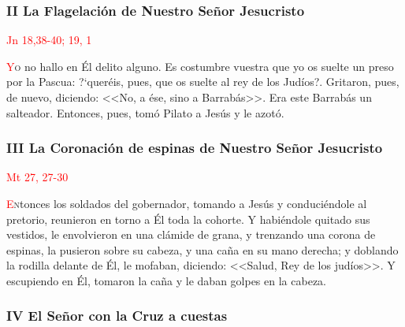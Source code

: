 \documentclass[10pt,twoside]{book}
\begin{document}
\noindent\subsubsection*{II La Flagelación de Nuestro Señor Jesucristo}

\vspace{-0.5em}

\hfill\textcolor{red}{Jn 18,38-40; 19, 1}

\lettrine[lines=2, ante=\guillemotleft]{\textcolor{red}{Y}}o no hallo en Él delito alguno. Es costumbre vuestra que yo os suelte un preso por la Pascua: {?`}queréis, 
pues, que os suelte al rey de los Judíos?\guillemotright. Gritaron, pues, de nuevo, diciendo: <<No, a ése, sino a Barrabás>>. 
Era este Barrabás un salteador. Entonces, pues, tomó Pilato a Jesús y le azotó.

\vspace{0.5em}



\vspace{1.5em}

\noindent\subsubsection*{III La Coronación de espinas de Nuestro Señor Jesucristo}

\vspace{-0.5em}

\hfill\textcolor{red}{Mt 27, 27-30}

\lettrine[lines=2]{\textcolor{red}{E}}ntonces los soldados del gobernador, tomando a Jesús y conduciéndole al pretorio, reunieron en torno a Él toda la cohorte. 
Y habiéndole quitado sus vestidos, le envolvieron en una clámide de grana, y trenzando una corona de espinas, la pusieron sobre su cabeza, 
y una caña en su mano derecha; y doblando la rodilla delante de Él, le mofaban, diciendo: <<Salud, Rey de los judíos>>. Y escupiendo en Él, 
tomaron la caña y le daban golpes en la cabeza.

\vspace{0.5em}



\vspace{1.5em}

\noindent\subsubsection*{IV El Señor con la Cruz a cuestas}
\end{document}
